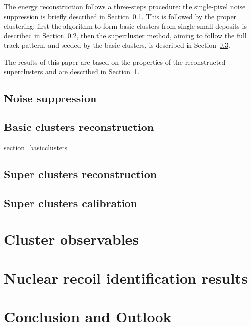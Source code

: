 \documentclass[12pt]{iopart}
\begin{document}
The energy reconstruction follows a three-steps procedure: the
single-pixel noise suppression is briefly described in
Section~\ref{sec:zerosuppression}. This is followed by the proper
clustering: first the algorithm to form basic clusters from single
small deposits is described in Section~\ref{sec:basiccl}, then the
supercluster method, aiming to follow the full track pattern, and
seeded by the basic clusters, is described in
Section~\ref{sec:supercl}.

The results of this paper are based on the properties of the
reconstructed superclusters and are described in
Section~\ref{sec:clustershapes}.


\subsection{Noise suppression}
\label{sec:zerosuppression}



\subsection{Basic clusters reconstruction}
\label{sec:basiccl}
 {section_basicclusters}


\subsection{Super clusters reconstruction}
\label{sec:supercl}


\clearpage

\subsection{Super clusters calibration}
\label{sec:calibration}



\section{Cluster observables}
\label{sec:clustershapes}


 
\section{Nuclear recoil identification results}
\label{sec:results}

 
\clearpage

\section{Conclusion and Outlook}
 
 

{}

\end{document}

